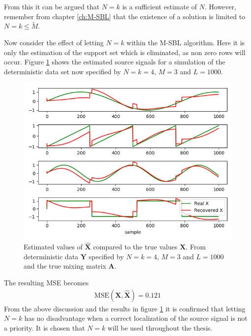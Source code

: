 From this it can be argued that $N = k$ is a sufficient estimate of $N$. 
However, remember from chapter \ref{ch:M-SBL} that the existence of a solution is limited to $N = k \leq \widetilde{M}$.

Now consider the effect of letting $N = k$ within the M-SBL algorithm. 
Here it is only the estimation of the support set which is eliminated, as non zero rows will occur. 
Figure \ref{fig:M-SBL_simple3} shows the estimated source signals for a simulation of the deterministic data set now specified by $N = k = 4$, $M = 3$ and $L = 1000$. 
\begin{figure}[H]
\centering
\includegraphics[scale=0.5]{figures/ch_6/M-SBL_simple3.png}
\caption{Estimated values of $\hat{\textbf{X}}$ compared to the true 				values $\textbf{X}$. From deterministic data $\textbf{Y}$ specified by $N=k=4$, $M = 3$ and $L=1000$  and the true mixing matrix $\mathbf{A}$.}
\label{fig:M-SBL_simple3}
\end{figure}
\noindent
The resulting MSE becomes
\begin{align*}
\text{MSE}(\mathbf{X}, \hat{\mathbf{X}}) = 0.121
\end{align*}
From the above discussion and the results in figure \ref{fig:M-SBL_simple3} it is confirmed that letting $N = k$ has no disadvantage when a correct localization of the source signal is not a priority. 
It is chosen that $N = k$ will be used throughout the thesis. 

